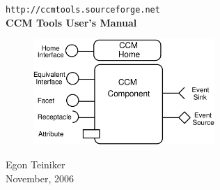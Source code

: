 \begin{titlepage}
\begin{center}

  	\vspace*{3cm}
  	{\LARGE \tt http://ccmtools.sourceforge.net} \\
  	\vspace{2cm}
  	{\huge \bf CCM Tools User's Manual} \\
  	\vspace{15mm}

	\begin{figure}[htbp]
		\begin{center}
			\includegraphics[height=4cm,angle=0] {figures/CCMSymbol}
	  	\end{center}
	\end{figure}
  	
  	\vspace{1cm}
  	{\LARGE Egon Teiniker} \\
  	
  	\vspace{15mm}
  	{\large November, 2006} 

\end{center}
\end{titlepage}